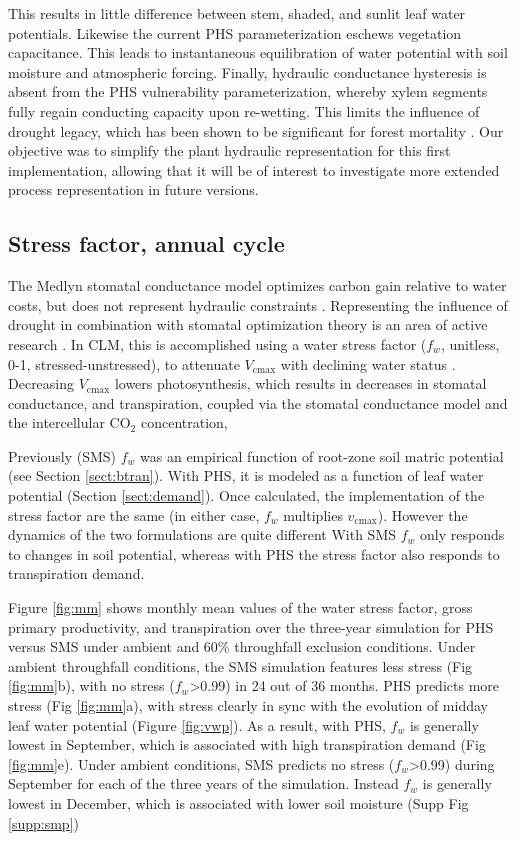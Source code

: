 \documentclass[draft,linenumbers]{agujournal}
\begin{document}
This results in little difference between stem, shaded, and sunlit leaf water potentials.
Likewise the current PHS parameterization eschews vegetation capacitance. \citep{meinzer2004}
This leads to instantaneous equilibration of water potential with soil moisture and atmospheric forcing.
Finally, hydraulic conductance hysteresis is absent from the PHS vulnerability parameterization, 
whereby xylem segments fully regain conducting capacity upon re-wetting.
This limits the influence of drought legacy, which has been shown to be significant for forest mortality \citep{anderegg2013}.
Our objective was to simplify the plant hydraulic representation for this first implementation, 
allowing that it will be of interest to investigate more extended process representation in future versions.

\subsection{Stress factor, annual cycle}

The Medlyn stomatal conductance model optimizes carbon gain relative to water costs, but does not represent hydraulic constraints \citep{medlyn2011}.
Representing the influence of drought in combination with stomatal optimization theory is an area of active research \citep{zhou2013,novick2016a}.
In CLM, this is accomplished using a water stress factor ($f_w$, unitless, 0-1, stressed-unstressed), to attenuate $V_{\text{cmax}}$ with declining water status \citep{oleson2013}. 
Decreasing $V_{\text{cmax}}$ lowers photosynthesis, which results in decreases in stomatal conductance, and transpiration, 
coupled via the stomatal conductance model and the intercellular CO$_2$ concentration, 

Previously (SMS) $f_w$ was an empirical function of root-zone soil matric potential (see Section \ref{sect:btran}).
With PHS, it is modeled as a function of leaf water potential (Section \ref{sect:demand}).
Once calculated, the implementation of the stress factor are the same (in either case, $f_w$ multiplies $v_{\text{cmax}}$).
However the dynamics of the two formulations are quite different
With SMS $f_w$ only responds to changes in soil potential,
whereas with PHS the stress factor also responds to transpiration demand.

Figure \ref{fig:mm} shows monthly mean values of the water stress factor, gross primary productivity, and transpiration
over the three-year simulation for PHS versus SMS under ambient and 60\% throughfall exclusion conditions.
Under ambient throughfall conditions, the SMS simulation features less stress (Fig \ref{fig:mm}b), with
no stress ($f_w$>0.99) in 24 out of 36 months.
PHS predicts more stress (Fig \ref{fig:mm}a), with stress clearly in sync with the evolution of midday leaf water potential (Figure \ref{fig:vwp}).
As a result, with PHS, $f_w$ is generally lowest in September, which is associated with high transpiration demand (Fig \ref{fig:mm}e).
Under ambient conditions, SMS predicts no stress ($f_w$>0.99) during September for each of the three years of the simulation.
Instead $f_w$ is generally lowest in December, which is associated with lower soil moisture (Supp Fig \ref{supp:smp})
\end{document}
